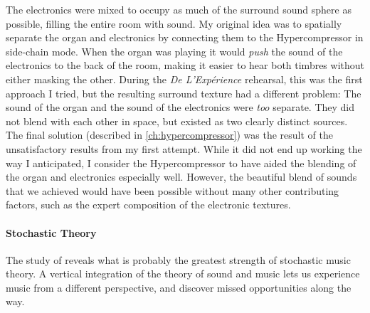 The electronics were mixed to occupy as much of the surround sound
sphere as possible, filling the entire room with sound.  My original
idea was to spatially separate the organ and electronics by connecting
them to the Hypercompressor in side-chain mode.  When the organ was
playing it would \emph{push} the sound of the electronics to the back
of the room, making it easier to hear both timbres without either
masking the other.  During the \textit{De L'Exp\'{e}rience} rehearsal,
this was the first approach I tried, but the resulting surround
texture had a different problem: The sound of the organ and the sound
of the electronics were \emph{too} separate. They did not blend with
each other in space, but existed as two clearly distinct sources. The
final solution (described in \autoref{ch:hypercompressor}) was the
result of the unsatisfactory results from my first attempt. While it
did not end up working the way I anticipated, I consider the
Hypercompressor to have aided the blending of the organ and
electronics especially well. However, the beautiful blend of sounds that
we achieved would have been possible without many other contributing
factors, such as the expert composition of the electronic textures.




\paragraph{Stochastic Theory} The study of \polytempic reveals what is
probably the greatest strength of stochastic music theory. A vertical
integration of the theory of sound and music lets us experience music
from a different perspective, and discover missed opportunities along the
way. 


